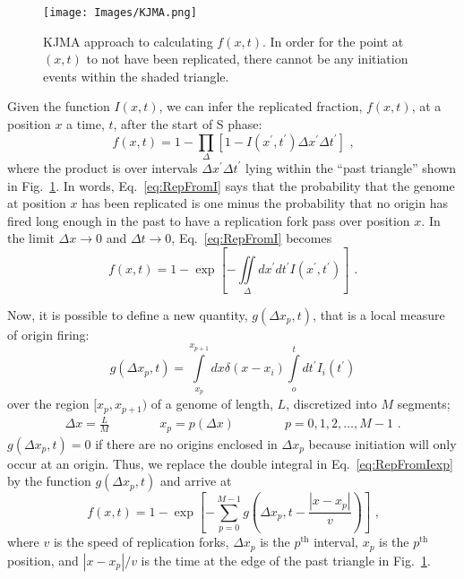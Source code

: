 		\begin{figure}[tbh]
			\begin{center}
				\texttt{[image: Images/KJMA.png]}
			\end{center}
				\caption[Illustration of Inferring the Replicated Fraction With KJMA]{\label{fig:KJMA} KJMA approach to calculating $f(x,t)$.
					In order for the point at $(x,t)$ to not have been replicated, there cannot be any initiation events within the shaded triangle.
				}
		\end{figure}
		
		Given the function $I(x,t)$, we can infer the replicated fraction, $f(x,t)$, at a position $x$ a time, $t$, after the start of S phase:
		\begin{equation} \label{eq:RepFromI}
			f\left( x,t\right) = 1 - \prod_\Delta\left[1-I\left( x^\prime,t^\prime\right)\Delta x^\prime\Delta t^\prime\right] \text{ ,}
		\end{equation}
		where the product is over intervals $\Delta x^\prime \Delta t^\prime$ lying within the ``past triangle'' shown in Fig.~\ref{fig:KJMA}.
		In words, Eq.~\ref{eq:RepFromI} says that the probability that the genome at position $x$ has been replicated is one minus the probability that no origin has fired long enough in the past to have a replication fork pass over position $x$.
		In the limit $\Delta x\rightarrow0$ and $\Delta t\rightarrow0$, Eq.~\ref{eq:RepFromI} becomes
		\begin{equation} \label{eq:RepFromIexp}
			f\left( x,t\right) = 1 - \exp\left[-\iint\limits_\Delta dx^\prime dt^\prime I\left( x^\prime,t^\prime\right)\right] \text{ .}
		\end{equation}
		
		Now, it is possible to define a new quantity, $g(\Delta x_p,t)$, that is a local measure of origin firing:
		\begin{equation} \label{eq:LocalOriginFiring}
			g\left(\Delta x_p,t\right) = \int\limits_{x_p}^{x_{p+1}} dx \delta\left( x-x_i\right) \int\limits_o^t dt^\prime I_i\left( t^\prime\right)
		\end{equation}
		over the region $[x_p, x_{p+1})$ of a genome of length, $L$, discretized into $M$ segments;
		\begin{align}
			\Delta x = \frac{L}{M} \qquad\qquad x_p = p\left(\Delta x\right) \qquad\qquad p = 0, 1, 2, \ldots , M-1 \text{ .}
		\end{align}
		$g(\Delta x_p,t)=0$ if there are no origins enclosed in $\Delta x_p$ because initiation will only occur at an origin.
		Thus, we replace the double integral in Eq.~\ref{eq:RepFromIexp} by the function $g(\Delta x_p,t)$ and arrive at
		\begin{equation} \label{eq:RepFromG}
			f\left( x,t\right) = 1 - \exp\left[ - \sum\limits_{p=0}^{M-1}g\left(\Delta x_p,t-\frac{\left| x-x_p \right|}{v}\right)\right] \text{ ,}
		\end{equation}
		where $v$ is the speed of replication forks, $\Delta x_p$ is the $p^\text{th}$ interval, $x_p$ is the $p^\text{th}$ position, and $\left| x-x_p \right|/v$ is the time at the edge of the past triangle in Fig.~\ref{fig:KJMA}.
		
